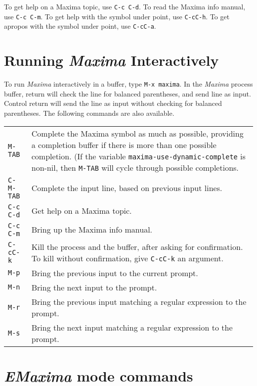 \documentclass{article}
\newcommand{\emx}{\textsl{\sffamily EMaxima}}
\newcommand{\mx}{\textsl{\sffamily Maxima}}
\begin{document}
To get help on a Maxima topic, use \texttt{C-c C-d}.
To read the Maxima info manual, use \texttt{C-c C-m}.
To get help with the symbol under point, use \texttt{C-cC-h}.
To get apropos with the symbol under point, use \texttt{C-cC-a}.


\section{Running \mx{} Interactively}

\noindent
To run \mx{} interactively in a buffer, type \texttt{M-x maxima}.
In the \mx{} process buffer,
return will check the line for balanced parentheses, and send line as input.
Control return will send the line as input without checking for balanced
parentheses.  The following commands are also available.

\smallskip

\begin{tabular}{p{\firstcol}p{\secondcol}}
\texttt{M-TAB} & Complete the Maxima symbol as much as possible, providing
     a completion buffer if there is more than one possible
     completion.  (If the variable
     \texttt{maxima-use-dynamic-complete} is non-nil, then
     \texttt{M-TAB} will cycle through possible completions.\\
\texttt{C-M-TAB} & Complete the input line, based on previous input lines.\\
\texttt{C-c C-d} & Get help on a Maxima topic.\\
\texttt{C-c C-m} & Bring up the Maxima info manual.\\
\texttt{C-cC-k} & Kill the process and the buffer, after asking for
  confirmation.  To kill without confirmation, give \texttt{C-cC-k} an
  argument.\\
\texttt{M-p} & Bring the previous input to the current prompt.\\
\texttt{M-n} & Bring the next input to the prompt.\\
\texttt{M-r} & Bring the previous input matching
  a regular expression to the prompt.\\
\texttt{M-s} & Bring the next input matching
  a regular expression to the prompt.
\end{tabular}



\newpage

\section{\emx{} mode commands}
\end{document}
